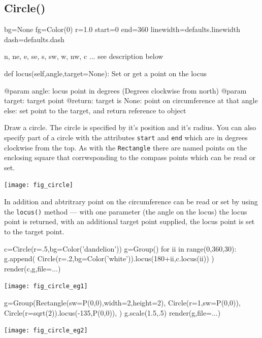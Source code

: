 \documentclass[a4paper]{book}
\begin{document}
\subsection{Circle()}
\label{sec:circle}
\begin{python}
    bg=None
    fg=Color(0)
    r=1.0
    start=0
    end=360
    linewidth=defaults.linewidth
    dash=defaults.dash
    
    n, ne, e, se, s, sw, w, nw, c  ... see description below

    def locus(self,angle,target=None):
        Set or get a point on the locus

        @param angle: locus point in degrees
                      (Degrees clockwise from north)
        @param target: target point
        @return: target is None: point on circumference at that angle
                 else: set point to the target, and return reference
                       to object

\end{python}
Draw a circle. The circle is specified by it's position and it's
radius.  You can also specify part of a circle with the attributes
\Verb|start| and \Verb|end| which are in degrees clockwise from the
top. As with the \Verb|Rectangle| there are named points on the
enclosing square that corrwsponding to the compass points which can be
read or set.
\begin{center}
  \texttt{[image: fig\_circle]}
\end{center}
In addition and abtritrary point on the circumference can be read or
set by using the \Verb|locus()| method --- with one parameter (the
angle on the locus) the locus point is returned, with an additional
target point supplied, the locus point is set to the target point.
\begin{example}
\begin{python}
c=Circle(r=.5,bg=Color('dandelion'))
g=Group()
for ii in range(0,360,30):
    g.append(
        Circle(r=.2,bg=Color('white')).locus(180+ii,c.locus(ii))
        )
render(c,g,file=...)
\end{python}
\begin{center}
  \texttt{[image: fig\_circle\_eg1]}
\end{center}
\end{example}
\begin{example}
\begin{python}
g=Group(Rectangle(sw=P(0,0),width=2,height=2),
        Circle(r=1,sw=P(0,0)),
        Circle(r=sqrt(2)).locus(-135,P(0,0)),
        )
g.scale(1.5,.5)
render(g,file=...)
\end{python}
\begin{center}
  \texttt{[image: fig\_circle\_eg2]}
\end{center}
\end{example}
\end{document}
